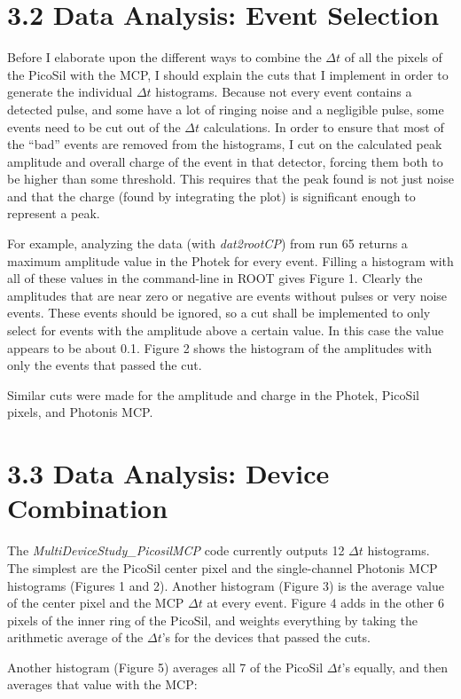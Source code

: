 \documentclass[12pt]{article}
\begin{document}
\section*{3.2 Data Analysis: Event Selection}
Before I elaborate upon the different ways to combine the $\Delta t$ of all the pixels of the PicoSil with the MCP, I should explain the cuts that I implement in order to generate the individual $\Delta t$ histograms. Because not every event contains a detected pulse, and some have a lot of ringing noise and a negligible pulse, some events need to be cut out of the $\Delta t$ calculations. In order to ensure that most of the “bad” events are removed from the histograms, I cut on the calculated peak amplitude and overall charge of the event in that detector, forcing them both to be higher than some threshold. This requires that the peak found is not just noise and that the charge (found by integrating the plot) is significant enough to represent a peak.

For example, analyzing the data (with \textit{dat2rootCP}) from run 65 returns a maximum amplitude value in the Photek for every event. Filling a histogram with all of these values in the command-line in ROOT gives Figure 1. Clearly the amplitudes that are near zero or negative are events without pulses or very noise events. These events should be ignored, so a cut shall be implemented to only select for events with the amplitude above a certain value. In this case the value appears to be about 0.1. Figure 2 shows the histogram of the amplitudes with only the events that passed the cut.


Similar cuts were made for the amplitude and charge in the Photek, PicoSil pixels, and Photonis MCP. 

\section*{3.3 Data Analysis: Device Combination}
The \textit{MultiDeviceStudy\_PicosilMCP} code currently outputs 12 $\Delta t$ histograms. The simplest are the PicoSil center pixel and the single-channel Photonis MCP histograms (Figures 1 and 2). Another histogram (Figure 3) is the average value of the center pixel and the MCP $\Delta t$ at every event. Figure 4 adds in the other 6 pixels of the inner ring of the PicoSil, and weights everything by taking the arithmetic average of the $\Delta t$’s for the devices that passed the cuts.

	Another histogram (Figure 5) averages all 7 of the PicoSil $\Delta t$’s equally, and then averages that value with the MCP:
\end{document}
